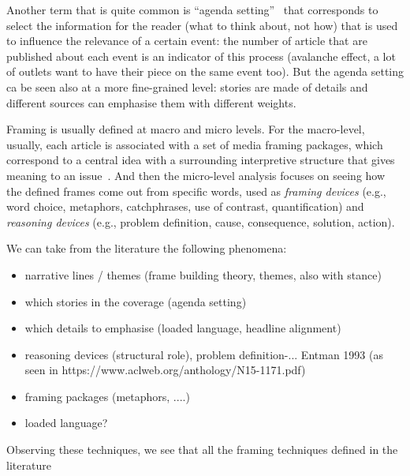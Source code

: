 Another term that is quite common is ``agenda setting''~\cite{mccombs1972agenda} that corresponds to select the information for the reader (what to think about, not how) that is used to influence the relevance of a certain event: the number of article that are published about each event is an indicator of this process (avalanche effect, a lot of outlets want to have their piece on the same event too).
But the agenda setting ca be seen also at a more fine-grained level: stories are made of details and different sources can emphasise them with different weights.


Framing is usually defined at macro and micro levels.
For the macro-level, usually, each article is associated with a set of media framing packages, which correspond to a central idea with a surrounding interpretive structure that gives meaning to an issue~\cite{gamson1989media}. And then the micro-level analysis focuses on seeing how the defined frames come out from specific words, used as \textit{framing devices} (e.g., word choice, metaphors, catchphrases, use of contrast, quantification) and \textit{reasoning devices} (e.g., problem definition, cause, consequence, solution, action).

We can take from the literature the following phenomena:

\begin{itemize}
    \item narrative lines / themes (frame building theory, themes, also with stance)
    \item which stories in the coverage (agenda setting)
    \item which details to emphasise (loaded language, headline alignment)
    \item reasoning devices (structural role), problem definition-...  Entman 1993 (as seen in https://www.aclweb.org/anthology/N15-1171.pdf)
    \item framing packages (metaphors, ....)
    \item loaded language?
\end{itemize}

Observing these techniques, we see that all the framing techniques defined in the literature

